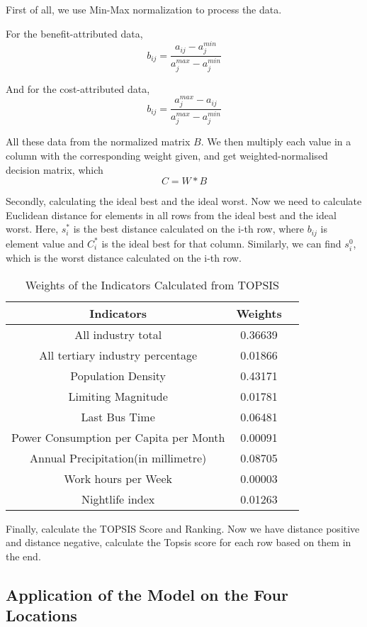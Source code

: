 First of all, we use Min-Max normalization to process the data.

For the benefit-attributed data,
$$b_{ij}=\frac{a_{ij}-a_j^{min}}{a_j^{max}-a_j^{min}}$$

And for the cost-attributed data,
$$b_{ij}=\frac{a_{j}^{max}-a_{ij}}{a_j^{max}-a_j^{min}}$$

All these data from the normalized matrix $B$. We then multiply each value in a column with the corresponding weight given, and get weighted-normalised decision matrix, which $$C=W*B$$

Secondly, calculating the ideal best and the ideal worst. Now we need to calculate Euclidean distance for elements in all rows from the ideal best and the ideal worst. Here, $s_i^*$ is the best distance calculated on the i-th row, where $b_{ij}$ is element value and $C_i^{*}$ is the ideal best for that column. Similarly, we can find $s_i^0$, which is the worst distance calculated on the i-th row.

\begin{table}[H] \centering
    \caption{Weights of the Indicators Calculated from TOPSIS}
    \begin{tabular}{ccl}
        \toprule
        Indicators & Weights\\ \hline
        All industry total & 0.36639\\
        All tertiary industry percentage & 0.01866\\
        Population Density & 0.43171\\
        Limiting Magnitude & 0.01781\\
        Last Bus Time & 0.06481\\
        Power Consumption per Capita per Month & 0.00091\\
        Annual Precipitation(in millimetre) & 0.08705\\
        Work hours per Week & 0.00003\\
        Nightlife index & 0.01263\\
        \bottomrule
    \end{tabular}
\end{table}

Finally, calculate the TOPSIS Score and Ranking. Now we have distance positive and distance negative, calculate the Topsis score for each row based on them in the end.

\subsection{Application of the Model on the Four Locations}


